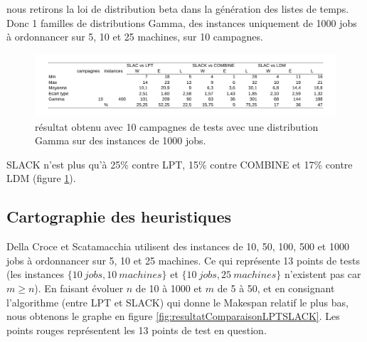 \documentclass[a4paper,12pt]{report}
\theoremstyle{plain}				%
\theoremstyle{definition}				%
\newcommand{\lp}[1]{\todo[author=LP,color=yellow,inline]{#1}}
\begin{document}
\bigskip
nous retirons la loi de distribution beta dans la génération des listes de temps.
Donc 1 familles de distributions Gamma, 
  des instances uniquement de 1000 jobs à ordonnancer sur 5, 10 et 25 machines,
  sur 10 campagnes.
\lp{Dire pourquoi tu fais ça}
\begin{figure}
{\centering
\includegraphics[width=\columnwidth]{7_Resultat_Reproduction10Gamma1000.pdf}
\caption{résultat obtenu avec 10 campagnes de tests avec une distribution Gamma sur des instances de 1000 jobs.}
\label{fig:resultatReproduction10Gamma1000}
\par}
\end{figure}

SLACK n'est plus qu'à 25\% contre LPT, 15\% contre COMBINE et 17\% contre LDM (figure \ref{fig:resultatReproduction10Gamma1000}).


\subsection{Cartographie des heuristiques}
\label{ssec:resultatsCartographie}

Della Croce et Scatamacchia utilisent des instances de 10, 50, 100, 500 et 1000 jobs à ordonnancer sur 5, 10 et 25 machines. 
Ce qui représente 13 points de tests 
  (les instances 
  $\{10~jobs,10~machines\}$ et 
  $\{10~jobs,25~machines\}$ n'existent pas car $m\geq n$).
En faisant évoluer $n$ de 10 à 1000 et $m$ de 5 à 50, 
  et en consignant l'algorithme (entre LPT et SLACK) qui donne 
  le Makespan relatif le plus bas, nous obtenons le graphe en figure \ref{fig:resultatComparaisonLPTSLACK}.
Les points rouges représentent les 13 points de test en question.
\end{document}
